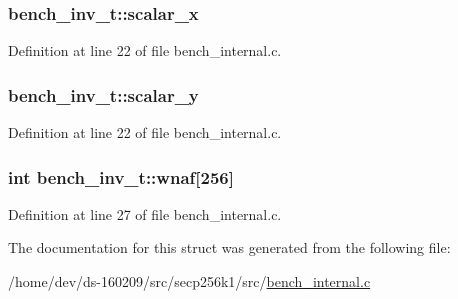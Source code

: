 \hypertarget{structbench__inv__t_afbceac71719c71325b7ad1b126b73734}{}
\subsubsection[{scalar\+\_\+x}]{ bench\+\_\+inv\+\_\+t\+::scalar\+\_\+x}\label{structbench__inv__t_afbceac71719c71325b7ad1b126b73734}


Definition at line 22 of file bench\+\_\+internal.\+c.

\hypertarget{structbench__inv__t_a87f434ca8cb31f90f37dab4099e78822}{}
\subsubsection[{scalar\+\_\+y}]{ bench\+\_\+inv\+\_\+t\+::scalar\+\_\+y}\label{structbench__inv__t_a87f434ca8cb31f90f37dab4099e78822}


Definition at line 22 of file bench\+\_\+internal.\+c.

\hypertarget{structbench__inv__t_ad3f27ccce40e43c4d9efd6942b911de1}{}
\subsubsection[{wnaf}]{\setlength{\rightskip}{0pt plus 5cm}int bench\+\_\+inv\+\_\+t\+::wnaf\mbox{[}256\mbox{]}}\label{structbench__inv__t_ad3f27ccce40e43c4d9efd6942b911de1}


Definition at line 27 of file bench\+\_\+internal.\+c.



The documentation for this struct was generated from the following file\+:\begin{DoxyCompactItemize}
\item 
/home/dev/ds-\/160209/src/secp256k1/src/\hyperlink{bench__internal_8c}{bench\+\_\+internal.\+c}\end{DoxyCompactItemize}
